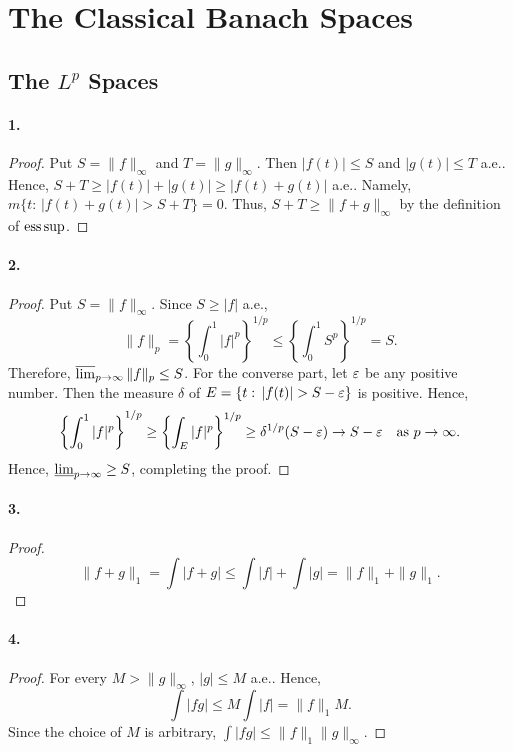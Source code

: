 \section{The Classical Banach Spaces}
\subsection{The $L^p$ Spaces}
  \paragraph{1.}
  \begin{proof}
    Put $S=\|f\|_\infty$ and $T=\|g\|_\infty$. Then $|f(t)|\le S$ and $|g(t)|\le
    T$ a.e.. Hence, $S+T\ge |f(t)|+|g(t)| \ge |f(t)+g(t)|$ a.e.. Namely, $m\{t:
    \,|f(t)+g(t)|>S+T\}=0$. Thus, $S+T\ge \|f+g\|_\infty$ by the definition of 
    $\operatorname*{ess\,sup}$.
  \end{proof}

  \paragraph{2.}
  \begin{proof}
    Put $S=\|f\|_\infty$. Since $S\ge |f|$ a.e., 
    \[
      \|f\|_p=
      \left\{\int_0^1|f|^p\right\}^{1/p} \le 
      \left\{\int_0^1S^p\right\}^{1/p} = S.
    \]
    Therefore, $\operatorname*{\overline{lim}}_{p\to\infty}\|f\|_p \le S$. For the converse part, let 
    $\varepsilon$ be any positive number. Then the measure $\delta$ of $E=\{t:\,|f(t)|>
    S-\vep\}$ is positive. Hence,
    \[
      \left\{\int_0^1|f|^p\right\}^{1/p} \ge
      \left\{\int_E|f|^p\right\}^{1/p} \ge 
      \delta^{1/p}(S-\varepsilon) \to 
      S-\varepsilon\quad\text{as $p\to\infty$.}
    \]
    Hence, $\operatorname*{\underline{lim}}_{p\to\infty}\ge S$, completing the proof.
  \end{proof}

  \paragraph{3.}
  \begin{proof}
    \[
      \|f+g\|_1 = \int|f+g| \le \int|f|+\int|g| = \|f\|_1+\|g\|_1.
    \]
  \end{proof}

  \paragraph{4.}
  \begin{proof}
    For every $M>\|g\|_\infty$, $|g|\le M$ a.e.. Hence,
    \[
      \int|fg|\le M\int|f| = \|f\|_1 M.
    \]
    Since the choice of $M$ is arbitrary, $\int|fg|\le \|f\|_1\|g\|_\infty$.
  \end{proof}
